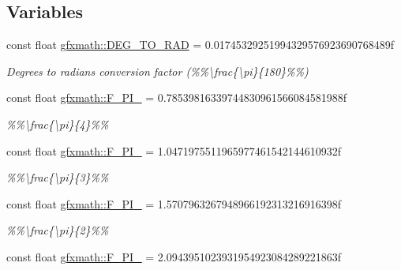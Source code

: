 \subsection*{Variables}
\begin{DoxyCompactItemize}
\item 
\hypertarget{group___scalar_math_consts_ga775ec2b017832b9f00808716a8a5678d}{}const float \hyperlink{group___scalar_math_consts_ga775ec2b017832b9f00808716a8a5678d}{gfxmath\+::\+D\+E\+G\+\_\+\+T\+O\+\_\+\+R\+A\+D} = 0.\+01745329251994329576923690768489f\label{group___scalar_math_consts_ga775ec2b017832b9f00808716a8a5678d}

\begin{DoxyCompactList}\small\item\em Degrees to radians conversion factor (\%\%\textbackslash{}frac\{\textbackslash{}pi\}\{180\}\%\%) \end{DoxyCompactList}\item 
\hypertarget{group___scalar_math_consts_ga25da08d770169dc837f7e766a4af50c7}{}const float \hyperlink{group___scalar_math_consts_ga25da08d770169dc837f7e766a4af50c7}{gfxmath\+::\+F\+\_\+\+P\+I\+\_} = 0.\+78539816339744830961566084581988f\label{group___scalar_math_consts_ga25da08d770169dc837f7e766a4af50c7}

\begin{DoxyCompactList}\small\item\em \%\%\textbackslash{}frac\{\textbackslash{}pi\}\{4\}\%\% \end{DoxyCompactList}\item 
\hypertarget{group___scalar_math_consts_ga55f78cc108bc6d4c3338b9a5605ea23e}{}const float \hyperlink{group___scalar_math_consts_ga55f78cc108bc6d4c3338b9a5605ea23e}{gfxmath\+::\+F\+\_\+\+P\+I\+\_} = 1.\+0471975511965977461542144610932f\label{group___scalar_math_consts_ga55f78cc108bc6d4c3338b9a5605ea23e}

\begin{DoxyCompactList}\small\item\em \%\%\textbackslash{}frac\{\textbackslash{}pi\}\{3\}\%\% \end{DoxyCompactList}\item 
\hypertarget{group___scalar_math_consts_ga0c8bf8cc8172c063476b12e41af90fdd}{}const float \hyperlink{group___scalar_math_consts_ga0c8bf8cc8172c063476b12e41af90fdd}{gfxmath\+::\+F\+\_\+\+P\+I\+\_} = 1.\+5707963267948966192313216916398f\label{group___scalar_math_consts_ga0c8bf8cc8172c063476b12e41af90fdd}

\begin{DoxyCompactList}\small\item\em \%\%\textbackslash{}frac\{\textbackslash{}pi\}\{2\}\%\% \end{DoxyCompactList}\item 
\hypertarget{group___scalar_math_consts_gaf3d6bddb166a005a45bc10c5a28439db}{}const float \hyperlink{group___scalar_math_consts_gaf3d6bddb166a005a45bc10c5a28439db}{gfxmath\+::\+F\+\_\+P\+I\+\_} = 2.\+0943951023931954923084289221863f\label{group___scalar_math_consts_gaf3d6bddb166a005a45bc10c5a28439db}


\end{DoxyCompactItemize}
